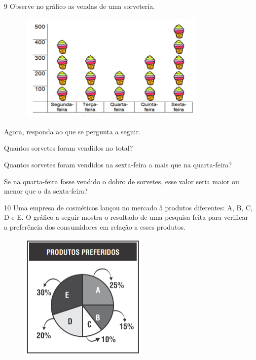 {{{{\begin{escolha}
\end{escolha}

\num{9}  Observe no gráfico as vendas de uma sorveteria.

\begin{figure}[H]
\centering\includegraphics[width=3.7in,height=2.1in]{./imgSAEB_6_MAT/media/image87.png}
\end{figure}

Agora, responda ao que se pergunta a seguir.

\begin{escolha}
\item Quantos sorvetes foram vendidos no total?


\item Quantos sorvetes foram vendidos na sexta-feira a mais que na quarta-feira?


\item Se na quarta-feira fosse vendido o dobro de sorvetes, esse valor seria
maior ou menor que o da sexta-feira?

\end{escolha}

\num{10} Uma empresa de cosméticos lançou no mercado $5$ produtos diferentes:
A, B, C, D e E. O gráfico a seguir mostra o resultado de uma pesquisa feita para
verificar a preferência dos consumidores em relação a esses produtos.

\begin{figure}[H]
\centering\includegraphics[width=2.51181in,height=2.47708in]{./imgSAEB_6_MAT/media/image88.png}
\end{figure}

}}}}
